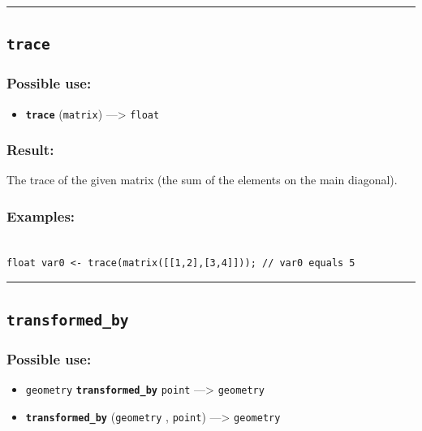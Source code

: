 \documentclass[]{book}
\providecommand{\tightlist}{%
  \setlength{\itemsep}{0pt}\setlength{\parskip}{0pt}}
\theoremstyle{definition}
\theoremstyle{definition}
\theoremstyle{definition}
\theoremstyle{remark}
\begin{document}
\begin{center}\rule{0.5\linewidth}{\linethickness}\end{center}

\subsection{\texorpdfstring{\texttt{trace}}{trace}}\label{trace}

\subsubsection{Possible use:}\label{possible-use-529}

\begin{itemize}
\tightlist
\item
  \textbf{\texttt{trace}} (\texttt{matrix}) ---\textgreater{}
  \texttt{float}
\end{itemize}

\subsubsection{Result:}\label{result-511}

The trace of the given matrix (the sum of the elements on the main
diagonal).

\subsubsection{Examples:}\label{examples-366}

\begin{verbatim}
 
float var0 <- trace(matrix([[1,2],[3,4]])); // var0 equals 5
\end{verbatim}

\begin{center}\rule{0.5\linewidth}{\linethickness}\end{center}

\subsection{\texorpdfstring{\texttt{transformed\_by}}{transformed\_by}}\label{transformed_by}

\subsubsection{Possible use:}\label{possible-use-530}

\begin{itemize}
\tightlist
\item
  \texttt{geometry} \textbf{\texttt{transformed\_by}} \texttt{point}
  ---\textgreater{} \texttt{geometry}
\item
  \textbf{\texttt{transformed\_by}} (\texttt{geometry} , \texttt{point})
  ---\textgreater{} \texttt{geometry}
\end{itemize}
\end{document}
